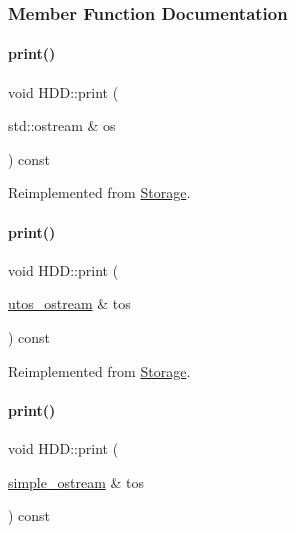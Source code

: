 \subsubsection{Member Function Documentation}
\mbox{\label{class_h_d_d_a07c34356018542934a4dd91ce38b0821}} 
\paragraph{\texorpdfstring{print()}{print()}\hspace{0.1cm}{\footnotesize\ttfamily [1/4]}}
{\footnotesize\ttfamily void H\+D\+D\+::print (\begin{DoxyParamCaption}\item[{std\+::ostream \&}]{os }\end{DoxyParamCaption}) const\hspace{0.3cm}{\ttfamily [virtual]}}



Reimplemented from \mbox{\hyperlink{class_storage_aa9f6ffb0fd45839b54bd4e254270445d}{Storage}}.

\mbox{\label{class_h_d_d_aca2c2583fa3304917905cd9185b64539}} 
\paragraph{\texorpdfstring{print()}{print()}\hspace{0.1cm}{\footnotesize\ttfamily [2/4]}}
{\footnotesize\ttfamily void H\+D\+D\+::print (\begin{DoxyParamCaption}\item[{\mbox{\hyperlink{structutos__ostream}{utos\+\_\+ostream}} \&}]{tos }\end{DoxyParamCaption}) const\hspace{0.3cm}{\ttfamily [virtual]}}



Reimplemented from \mbox{\hyperlink{class_storage_ab7ecf9e0777891b4e1a84bbf391a1cd4}{Storage}}.

\mbox{\label{class_h_d_d_a0e48767713740f3ec7dafd907d3570b1}} 
\paragraph{\texorpdfstring{print()}{print()}\hspace{0.1cm}{\footnotesize\ttfamily [3/4]}}
{\footnotesize\ttfamily void H\+D\+D\+::print (\begin{DoxyParamCaption}\item[{\mbox{\hyperlink{structsimple__ostream}{simple\+\_\+ostream}} \&}]{tos }\end{DoxyParamCaption}) const\hspace{0.3cm}{\ttfamily [virtual]}}



